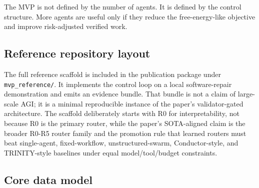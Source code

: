 The MVP is not defined by the number of agents. It is defined by the
control structure. More agents are useful only if they reduce the
free-energy-like objective and improve risk-adjusted verified work.

\subsection{Reference repository
layout}\label{reference-repository-layout}

\begin{Shaded}
\begin{Highlighting}[]
\end{Highlighting}
\end{Shaded}

The full reference scaffold is included in the publication package under
\texttt{mvp\_reference/}. It implements the control loop on a local
software-repair demonstration and emits an evidence bundle. That bundle
is not a claim of large-scale AGI; it is a minimal reproducible instance
of the paper's validator-gated architecture. The scaffold deliberately
starts with R0 for interpretability, not because R0 is the primary
router, while the paper's SOTA-aligned claim is the broader R0-R5 router
family and the promotion rule that learned routers must beat
single-agent, fixed-workflow, unstructured-swarm, Conductor-style, and
TRINITY-style baselines under equal model/tool/budget constraints.

\subsection{Core data model}\label{core-data-model}

